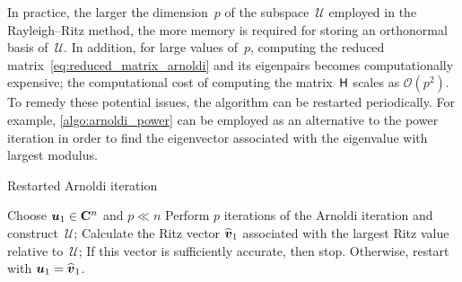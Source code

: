 In practice, the larger the dimension~$p$ of the subspace~$\mathcal U$ employed in the Rayleigh--Ritz method,
the more memory is required for storing an orthonormal basis of~$\mathcal U$.
In addition, for large values of~$p$,
computing the reduced matrix~\eqref{eq:reduced_matrix_arnoldi} and its eigenpairs becomes computationally expensive;
the computational cost of computing the matrix~$\mathsf H$ scales as $\mathcal O(p^2)$.
To remedy these potential issues,
the algorithm can be restarted periodically.
For example, \cref{algo:arnoldi_power} can be employed as an alternative to the power iteration
in order to find the eigenvector associated with the eigenvalue with largest modulus.

\begin{algorithm}
\caption{Restarted Arnoldi iteration}%
\label{algo:arnoldi_power}%
\begin{algorithmic}
\State Choose $\mathbf{\boldsymbol{u}}_1 \in \mathbf C^n$ and $p \ll n$
    \State Perform $p$ iterations of the Arnoldi iteration and construct~$\mathcal U$;
    \State Calculate the Ritz vector $\widehat {\mathbf{\boldsymbol{v}}}_1$ associated with the largest Ritz value relative to~$\mathcal U$;
    \State If this vector is sufficiently accurate, then stop. Otherwise, restart with $\mathbf{\boldsymbol{u}}_1 = \widehat {\mathbf{\boldsymbol{v}}}_1$.
\EndFor
\end{algorithmic}
\end{algorithm}

